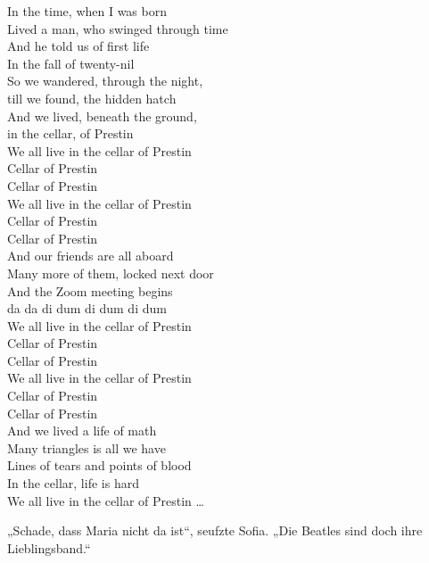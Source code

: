 \documentclass[oneside]{memoir}
\begin{document}
\begin{singlespace}
\bigskip
\noindent 
\glqq In the time, when I was born \\
Lived a man, who swinged through time \\
And he told us of first life \\
In the fall of twenty-nil \\

\noindent
So we wandered, through the night, \\
till we found, the hidden hatch \\
And we lived, beneath the ground, \\
in the cellar, of Prestin \\

\noindent 
We all live in the cellar of Prestin \\
Cellar of Prestin \\
Cellar of Prestin \\
We all live in the cellar of Prestin \\
Cellar of Prestin \\
Cellar of Prestin \\

\noindent 
And our friends are all aboard \\
Many more of them, locked next door \\
And the Zoom meeting begins \\
da da di dum di dum di dum \\

\noindent 
We all live in the cellar of Prestin \\
Cellar of Prestin \\
Cellar of Prestin \\
We all live in the cellar of Prestin \\
Cellar of Prestin \\
Cellar of Prestin \\

\noindent 
And we lived a life of math \\
Many triangles is all we have \\
Lines of tears and points of blood \\
In the cellar, life is hard \\ 

\noindent 
We all live in the cellar of Prestin \ldots\grqq
\end{singlespace}

„Schade, dass Maria nicht da ist“, seufzte Sofia. „Die Beatles sind doch ihre Lieblingsband.“
\end{document}

